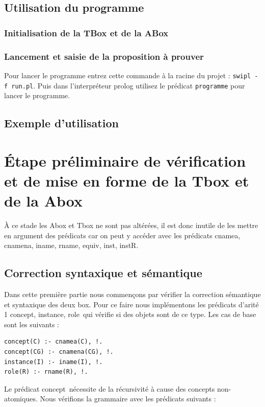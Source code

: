 \documentclass{article}
\begin{document}
\subsection{Utilisation du programme}
\subsubsection{Initialisation de la TBox et de la ABox}

\subsubsection{Lancement et saisie de la proposition à prouver}
Pour lancer le programme entrez cette commande à la racine du projet : \verb|swipl -f run.pl|. Puis dans l'interpréteur prolog utilisez le prédicat \verb|programme| pour lancer le programme.


\subsection{Exemple d'utilisation}


\section{\'Etape préliminaire de vérification et de mise en forme de la Tbox et de la Abox}
\`A ce stade les Abox et Tbox ne sont pas altérées, il est donc inutile de les mettre en argument des prédicats car on peut y accéder avec les prédicats \color{blue}cnamea, cnamena, iname, rname, equiv, inst, instR\color{black}.
\subsection{Correction syntaxique et sémantique}
Dans cette première partie nous commençons par vérifier la correction sémantique et syntaxique des deux box. Pour ce faire nous implémentons les prédicats d'arité 1 \color{blue}concept, instance, role\color{black}\ qui vérifie si des objets sont de ce type. Les cas de base sont les suivants :

\begin{verbatim}
concept(C) :- cnamea(C), !.
concept(CG) :- cnamena(CG), !. 
instance(I) :- iname(I), !.
role(R) :- rname(R), !. 
\end{verbatim}

Le prédicat \color{blue}concept\color{black}\ nécessite de la récursivité à cause des concepts non-atomiques. Nous vérifions la grammaire avec les prédicats suivants :
\end{document}
